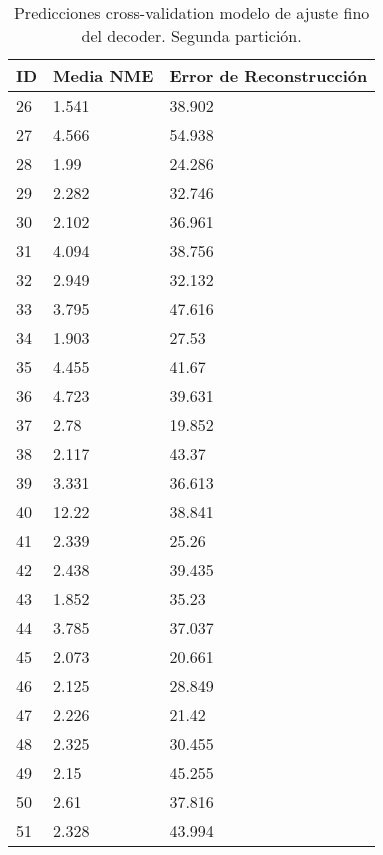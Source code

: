\begin{table}[!ht]
    \centering
    \caption{Predicciones cross-validation modelo de ajuste fino del  decoder. Segunda partición.}
    \begin{tabular}{|l|l|l|}
    \hline
    \cellcolor{gray!25}\textbf{ID} & \cellcolor{gray!25}\textbf{Media NME} & \cellcolor{gray!25}\textbf{Error de Reconstrucción} \\ \hline
        26 & 1.541 & 38.902 \\ \hline
        27 & 4.566 & 54.938 \\ \hline
        28 & 1.99 & 24.286 \\ \hline
        29 & 2.282 & 32.746 \\ \hline
        30 & 2.102 & 36.961 \\ \hline
        31 & 4.094 & 38.756 \\ \hline
        32 & 2.949 & 32.132 \\ \hline
        33 & 3.795 & 47.616 \\ \hline
        34 & 1.903 & 27.53 \\ \hline
        35 & 4.455 & 41.67 \\ \hline
        36 & 4.723 & 39.631 \\ \hline
        37 & 2.78 & 19.852 \\ \hline
        38 & 2.117 & 43.37 \\ \hline
        39 & 3.331 & 36.613 \\ \hline
        40 & 12.22 & 38.841 \\ \hline
        41 & 2.339 & 25.26 \\ \hline
        42 & 2.438 & 39.435 \\ \hline
        43 & 1.852 & 35.23 \\ \hline
        44 & 3.785 & 37.037 \\ \hline
        45 & 2.073 & 20.661 \\ \hline
        46 & 2.125 & 28.849 \\ \hline
        47 & 2.226 & 21.42 \\ \hline
        48 & 2.325 & 30.455 \\ \hline
        49 & 2.15 & 45.255 \\ \hline
        50 & 2.61 & 37.816 \\ \hline
        51 & 2.328 & 43.994 \\ \hline
    \end{tabular}
\end{table}

